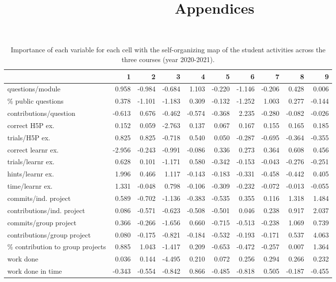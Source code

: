 \documentclass[
]{article}
\title{Appendices}
\author{}
\date{\vspace{-2.5em}}
\begin{document}
\maketitle

\begin{landscape}\begin{table}

\caption{\label{tab:somtab1}\label{tab:tab_som} Importance of each variable for each cell with the self-organizing map of the student activities across the three courses (year 2020-2021).}
\centering
\begin{tabular}[t]{l|r|r|r|r|r|r|r|r|r}
\hline
  & 1 & 2 & 3 & 4 & 5 & 6 & 7 & 8 & 9\\
\hline
questions/module & 0.958 & -0.984 & -0.684 & 1.103 & -0.220 & -1.146 & -0.206 & 0.428 & 0.006\\
\hline
\% public questions & 0.378 & -1.101 & -1.183 & 0.309 & -0.132 & -1.252 & 1.003 & 0.277 & -0.144\\
\hline
contributions/question & -0.613 & 0.676 & -0.462 & -0.574 & -0.368 & 2.235 & -0.280 & -0.082 & -0.026\\
\hline
correct H5P ex. & 0.152 & 0.059 & -2.763 & 0.137 & 0.067 & 0.167 & 0.155 & 0.165 & 0.185\\
\hline
trials/H5P ex. & 0.825 & 0.825 & -0.718 & 0.540 & 0.050 & -0.287 & -0.695 & -0.364 & -0.355\\
\hline
correct learnr ex. & -2.956 & -0.243 & -0.991 & -0.086 & 0.336 & 0.273 & 0.364 & 0.608 & 0.456\\
\hline
trials/learnr ex. & 0.628 & 0.101 & -1.171 & 0.580 & -0.342 & -0.153 & -0.043 & -0.276 & -0.251\\
\hline
hints/learnr ex. & 1.996 & 0.466 & 1.117 & -0.143 & -0.183 & -0.331 & -0.458 & -0.442 & 0.405\\
\hline
time/learnr ex. & 1.331 & -0.048 & 0.798 & -0.106 & -0.309 & -0.232 & -0.072 & -0.013 & -0.055\\
\hline
commits/ind. project & 0.589 & -0.702 & -1.136 & -0.383 & -0.535 & 0.355 & 0.116 & 1.318 & 1.484\\
\hline
contributions/ind. project & 0.086 & -0.571 & -0.623 & -0.508 & -0.501 & 0.046 & 0.238 & 0.917 & 2.037\\
\hline
commits/group project & 0.366 & -0.266 & -1.656 & 0.660 & -0.715 & -0.513 & -0.238 & 1.069 & 0.739\\
\hline
contributions/group project & 0.080 & -0.175 & -0.821 & -0.184 & -0.532 & -0.193 & -0.171 & 0.537 & 4.063\\
\hline
\% contribution to group projects & 0.885 & 1.043 & -1.417 & 0.209 & -0.653 & -0.472 & -0.257 & 0.007 & 1.364\\
\hline
work done & 0.036 & 0.144 & -4.495 & 0.210 & 0.072 & 0.256 & 0.294 & 0.266 & 0.232\\
\hline
work done in time & -0.343 & -0.554 & -0.842 & 0.866 & -0.485 & -0.818 & 0.505 & -0.187 & -0.455\\
\hline
\end{tabular}
\end{table}
\end{landscape}
\end{document}
